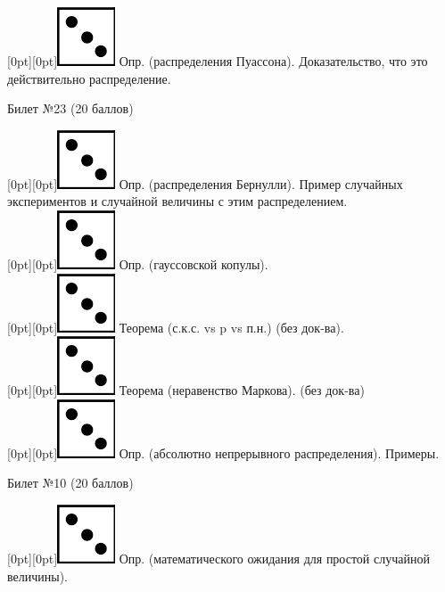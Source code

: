 \documentclass[10pt]{article}
\begin{document}
\raisebox{-1pt}[0pt][0pt]{\includegraphics[width=0.02\linewidth]{3.png}}  Опр. (распределения Пуассона). Доказательство, что это действительно распределение. \\

\begin{center} {\Large Билет №23 (20 баллов)} \end{center}

\raisebox{-1pt}[0pt][0pt]{\includegraphics[width=0.02\linewidth]{3.png}} Опр. (распределения Бернулли).  Пример случайных экспериментов и случайной величины с этим распределением. \\

\raisebox{-1pt}[0pt][0pt]{\includegraphics[width=0.02\linewidth]{3.png}} Опр. (гауссовской копулы). \\

\raisebox{-1pt}[0pt][0pt]{\includegraphics[width=0.02\linewidth]{3.png}} Теорема (с.к.с. vs p vs п.н.) (без док-ва). \\ 

\raisebox{-1pt}[0pt][0pt]{\includegraphics[width=0.02\linewidth]{3.png}} Теорема (неравенство Маркова). (без док-ва) \\

\raisebox{-1pt}[0pt][0pt]{\includegraphics[width=0.02\linewidth]{3.png}} Опр. (абсолютно непрерывного распределения). Примеры. \\

\begin{center} {\Large Билет №10 (20 баллов)} \end{center}

\raisebox{-1pt}[0pt][0pt]{\includegraphics[width=0.02\linewidth]{3.png}} Опр. (математического ожидания для простой случайной величины). \\
\end{document}
